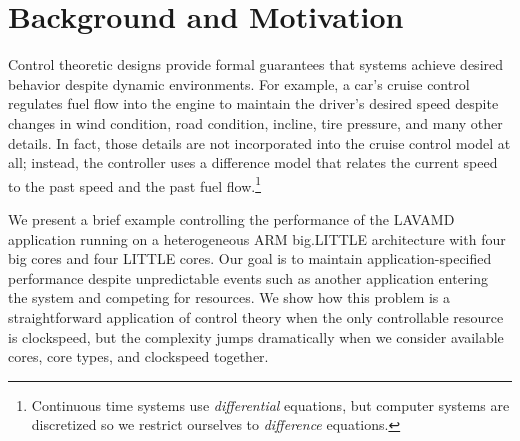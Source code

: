 \section{Background and Motivation}
\label{sec:example}
Control theoretic designs provide formal guarantees that systems
achieve desired behavior despite dynamic environments. For example, a
car's cruise control regulates fuel flow into the engine to maintain
the driver's desired speed despite changes in wind condition, road
condition, incline, tire pressure, and many other details.  In fact,
those details are not incorporated into the cruise control model at
all; instead, the controller uses a difference model that relates the
current speed to the past speed and the past fuel
flow.\footnote{Continuous time systems use \emph{differential}
  equations, but computer systems are discretized so we restrict
  ourselves to \emph{difference} equations.}

We present a brief example controlling the performance of the LAVAMD
application running on a heterogeneous ARM big.LITTLE architecture
with four big cores and four LITTLE cores.  Our goal is to maintain
application-specified performance despite unpredictable events such as
another application entering the system and competing for resources.
We show how this problem is a straightforward application of control
theory when the only controllable resource is clockspeed, but the
complexity jumps dramatically when we consider available cores, core
types, and clockspeed together.


